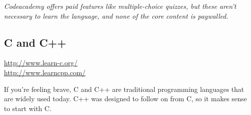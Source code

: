 		\footnotesize \textit{Codeacademy offers paid features like multiple-choice quizzes, but these aren't necessary to learn the language, and none of the core content is paywalled.} \normalsize
	
		\subsection*{C and C++}
		
		\url{http://www.learn-c.org/}
		\\ \url{http://www.learncpp.com/}
		
		If you're feeling brave, C and C++ are traditional programming languages that are widely used today. C++ was designed to follow on from C, so it makes sense to start with C.